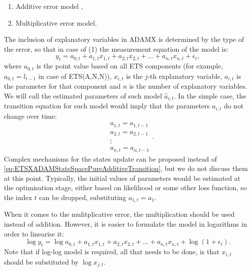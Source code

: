 \documentclass[
]{book}
\providecommand{\tightlist}{%
  \setlength{\itemsep}{0pt}\setlength{\parskip}{0pt}}
\theoremstyle{definition}
\theoremstyle{definition}
\theoremstyle{definition}
\theoremstyle{definition}
\theoremstyle{remark}
\begin{document}
\begin{enumerate}
\def\labelenumi{\arabic{enumi}.}
\tightlist
\item
  Additive error model \citep[which was discussed in][ in Chapter 9]{Hyndman2008b},
\item
  Multiplicative error model.
\end{enumerate}

The inclusion of explanatory variables in ADAMX is determined by the type of the error, so that in case of (1) the measurement equation of the model is:
\begin{equation}
  {y}_{t} = a_{0,t} + a_{1,t} x_{1,t} + a_{2,t} x_{2,t} + \dots + a_{n,t} x_{n,t} + \epsilon_t ,
  \label{eq:ETSXADAMStateSpacePureAdditiveMeasurement}
\end{equation}
where \(a_{0,t}\) is the point value based on all ETS components (for example, \(a_{0,t}=l_{t-1}\) in case of ETS(A,N,N)), \(x_{i,t}\) is the \(j\)-th explanatory variable, \(a_{i,t}\) is the parameter for that component and \(n\) is the number of explanatory variables. We will call the estimated parameters of such model \(\hat{a}_{i,t}\). In the simple case, the transition equation for such model would imply that the parameters \(a_{i,t}\) do not change over time:
\begin{equation}
  \begin{aligned}
    &a_{1,t} = a_{1,t-1} \\
    &a_{2,t} = a_{2,t-1} \\
    &\vdots \\
    &a_{n,t} = a_{n,t-1}
  \end{aligned} .
  \label{eq:ETSXADAMStateSpacePureAdditiveTransition}
\end{equation}
Complex mechanisms for the states update can be proposed instead of \eqref{eq:ETSXADAMStateSpacePureAdditiveTransition}, but we do not discuss them at this point. Typically, the initial values of parameters would be estimated at the optimisation stage, either based on likelihood or some other loss function, so the index \(t\) can be dropped, substituting \(a_{1,t}=a_{1}\).

When it comes to the mulitplicative error, the multiplication should be used instead of addition. However, it is easier to formulate the model in logarithms in order to linearise it:
\begin{equation}
  \log {y}_{t} = \log a_{0,t} + a_{1,t} x_{1,t} + a_{2,t} x_{2,t} + \dots + a_{n,t} x_{n,t} + \log(1+ \epsilon_t).
  \label{eq:ETSXADAMStateSpacePureAdditiveMeasurement}
\end{equation}
Note that if log-log model is required, all that needs to be done, is that \(x_{i,t}\) should be substituted by \(\log x_{j,t}\).
\end{document}

